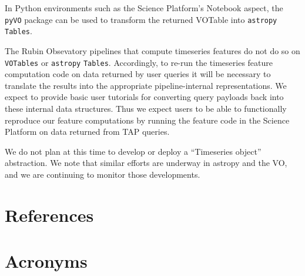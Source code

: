 \documentclass[DM,authoryear,toc]{lsstdoc}
\begin{document}
In Python environments such as the Science Platform's Notebook aspect, the \texttt{pyVO} package can be used to transform the returned VOTable into \texttt{astropy} \texttt{Tables}.

The Rubin Obsevatory pipelines that compute timeseries features do not do so on \texttt{VOTables} or \texttt{astropy} \texttt{Tables}.
Accordingly, to re-run the timeseries feature computation code on data returned by user queries it will be necessary to translate the results into the appropriate pipeline-internal representations.
We expect to provide basic user tutorials for converting query payloads back into these internal data structures.
Thus we expect users to be able to functionally reproduce our feature computations by running the feature code in the Science Platform on data returned from TAP queries.

We do not plan at this time to develop or deploy a ``Timeseries object'' abstraction.
We note that similar efforts are underway in astropy and the VO, and we are continuing to monitor those developments.

\appendix
\section{References} \label{sec:bib}


\section{Acronyms} \label{sec:acronyms}

\end{document}
